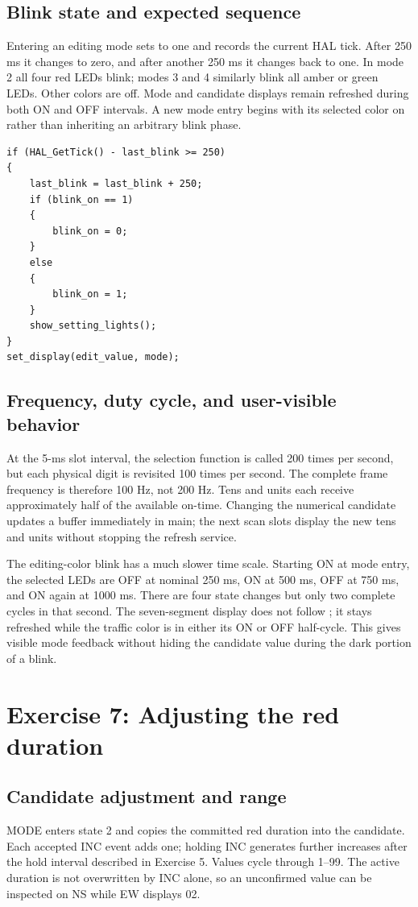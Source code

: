 \documentclass[a4paper]{article}
\newcommand{\code}[1]{\texttt{\detokenize{#1}}}
\newcommand{\topic}[1]{\subsection{#1}}
\begin{document}
\topic{Blink state and expected sequence}
Entering an editing mode sets \code{blink_on} to one and records the current
HAL tick. After 250 ms it changes to zero, and after another 250 ms it changes
back to one. In mode 2 all four red LEDs blink; modes 3 and 4 similarly blink
all amber or green LEDs. Other colors are off. Mode and candidate displays
remain refreshed during both ON and OFF intervals. A new mode entry begins
with its selected color on rather than inheriting an arbitrary blink phase.

\par\noindent\begin{minipage}{\linewidth}
\begin{lstlisting}[caption={Setting-mode blink scheduling}]
if (HAL_GetTick() - last_blink >= 250)
{
    last_blink = last_blink + 250;
    if (blink_on == 1)
    {
        blink_on = 0;
    }
    else
    {
        blink_on = 1;
    }
    show_setting_lights();
}
set_display(edit_value, mode);
\end{lstlisting}
\end{minipage}\par

\topic{Frequency, duty cycle, and user-visible behavior}

At the 5-ms slot interval, the selection function is called 200 times per
second, but each physical digit is revisited 100 times per second. The complete
frame frequency is therefore 100 Hz, not 200 Hz. Tens and units each receive
approximately half of the available on-time. Changing the numerical candidate
updates a buffer immediately in main; the next scan slots display the new
tens and units without stopping the refresh service.

The editing-color blink has a much slower time scale. Starting ON at mode
entry, the selected LEDs are OFF at nominal 250 ms, ON at 500 ms, OFF at
750 ms, and ON again at 1000 ms. There are four state changes but only two
complete cycles in that second. The seven-segment display does not follow
\code{blink_on}; it stays refreshed while the traffic color is in either
its ON or OFF half-cycle. This gives visible mode feedback without hiding the
candidate value during the dark portion of a blink.


\clearpage
\section{Exercise 7: Adjusting the red duration}

\topic{Candidate adjustment and range}
MODE enters state 2 and copies the committed red duration into the candidate.
Each accepted INC event adds one; holding INC generates further increases
after the hold interval described in Exercise 5. Values cycle through 1--99.
The active duration is not overwritten by INC alone, so an unconfirmed value
can be inspected on NS while EW displays 02.
\end{document}
